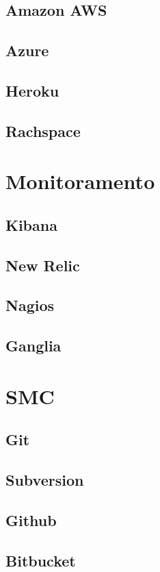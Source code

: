 	\subsection{Amazon AWS}
	\subsection{Azure}
	\subsection{Heroku}
	\subsection{Rachspace}

    \section{Monitoramento}

	\subsection{Kibana}
	\subsection{New Relic}
	\subsection{Nagios}
	\subsection{Ganglia}

    \section{SMC}

	\subsection{Git}
	\subsection{Subversion}
	\subsection{Github}
	\subsection{Bitbucket}
	
